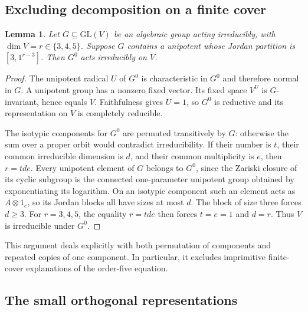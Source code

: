\documentclass[11pt,a4paper]{article}
\newtheorem{lemma}[theorem]{Lemma}
\theoremstyle{definition}
\theoremstyle{remark}
\numberwithin{equation}{section}
\begin{document}
\subsection{Excluding decomposition on a finite cover}

\begin{lemma}\label{p6:fs:connectedirred}
Let $G\subseteq\mathrm{GL}(V)$ be an algebraic group acting
irreducibly, with $\dim V=r\in\{3,4,5\}$. Suppose $G$ contains a
unipotent whose Jordan partition is $[3,1^{r-3}]$. Then $G^0$ acts
irreducibly on $V$.
\end{lemma}
\begin{proof}
The unipotent radical $U$ of $G^0$ is characteristic in $G^0$ and
therefore normal in $G$. A unipotent group has a nonzero fixed
vector. Its fixed space $V^U$ is $G$-invariant, hence equals $V$.
Faithfulness gives $U=1$, so $G^0$ is reductive and its representation
on $V$ is completely reducible.

The isotypic components for $G^0$ are permuted transitively by $G$:
otherwise the sum over a proper orbit would contradict irreducibility.
If their number is $t$, their common irreducible dimension is $d$,
and their common multiplicity is $e$, then $r=tde$.
Every unipotent element of $G$ belongs to $G^0$, since the Zariski
closure of its cyclic subgroup is the connected one-parameter
unipotent group obtained by exponentiating its logarithm.
On an isotypic component such an element acts as $A\otimes1_e$,
so its Jordan blocks all have sizes at most $d$.
The block of size three forces $d\ge3$.
For $r=3,4,5$, the equality $r=tde$ then forces $t=e=1$ and $d=r$.
Thus $V$ is irreducible under $G^0$.
\end{proof}

This argument deals explicitly with both permutation of components
and repeated copies of one component. In particular, it excludes
imprimitive finite-cover explanations of the order-five equation.

\subsection{The small orthogonal representations}
\end{document}
